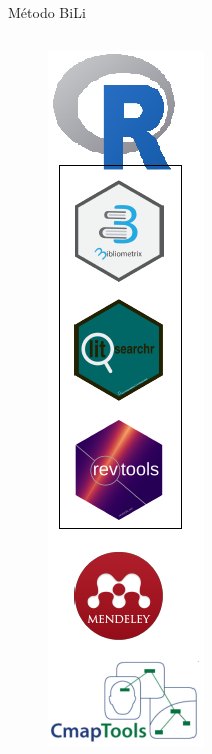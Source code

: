 \begin{frame}{Método BiLi}
\begin{columns}
\begin{figure}[hb]
            \includegraphics[width=1.3\textwidth]{figures/ferramentas.png}
		\end{figure}
	\end{columns}
\end{frame}

